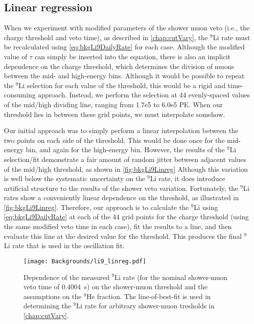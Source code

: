 \documentclass[../thesis.tex]{subfiles}
\begin{document}
\subsection{Linear regression}
\label{sec:bkgLi9LinReg}

When we experiment with modified parameters of the shower muon veto (i.e., the charge threshold and veto time), as described in \autoref{chap:cutVary}, the $^9$Li rate must be recalculated using \autoref{eq:bkgLi9DailyRate} for each case. Although the modified value of $\tau$ can simply be inserted into the equation, there is also an implicit dependence on the charge threshold, which determines the division of muons between the mid- and high-energy bins. Although it would be possible to repeat the $^9$Li selection for each value of the threshold, this would be a rigid and time-consuming approach. Instead, we perform the selection at 44 evenly-spaced values of the mid/high dividing line, ranging from 1.7e5 to 6.0e5 PE\@. When our threshold lies in between these grid points, we must interpolate somehow.

Our initial approach was to simply perform a linear interpolation between the two points on each side of the threshold. This would be done once for the mid-energy bin, and again for the high-energy bin. However, the results of the $^9$Li selection/fit demonstrate a fair amount of random jitter between adjacent values of the mid/high threshold, as shown in \autoref{fig:bkgLi9Linreg} Although this variation is well below the systematic uncertainty on the $^9$Li rate, it does introduce artificial structure to the results of the shower veto variation. Fortunately, the $^9$Li rates show a conveniently linear dependence on the threshold, as illustrated in \autoref{fig:bkgLi9Linreg}. Therefore, our approach is to calculate the $^9$Li using \autoref{eq:bkgLi9DailyRate} at each of the 44 grid points for the charge threshold (using the same modified veto time in each case), fit the results to a line, and then evaluate this line at the desired value for the threshold. This produces the final $^9$Li rate that is used in the oscillation fit.

\begin{figure}[h]
  \texttt{[image: Backgrounds/li9\_linreg.pdf]}
  \caption{Dependence of the measured $^9$Li rate (for the nominal shower-muon veto time of 0.4004~s) on the shower-muon threshold and the assumptions on the $^8$He fraction. The line-of-best-fit is used in determining the $^9$Li rate for arbitrary shower-muon tresholds in \ref{chap:cutVary}.}
  \label{fig:bkgLi9Linreg}
\end{figure}
\end{document}
